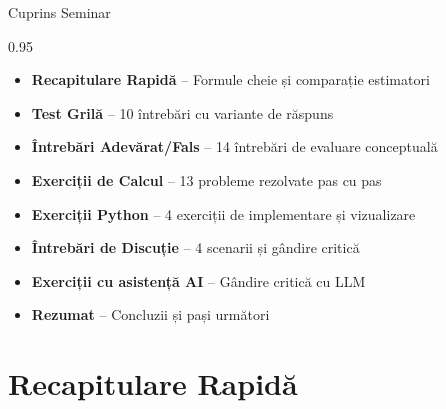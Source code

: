 \documentclass[9pt, aspectratio=169, t]{beamer}
\subtitle{Seminar 4: Estimatori de Volatilitate}
\begin{document}
{
\begin{frame}
    \titlepage
\end{frame}
}

\begin{frame}{Cuprins Seminar}
    \begin{cminipage}{0.95\textwidth}
    \begin{itemize}\setlength{\itemsep}{0pt}
        \item \textbf{Recapitulare Rapidă} -- Formule cheie și comparație estimatori
        \vspace{0.15cm}
        \item \textbf{Test Grilă} -- 10 întrebări cu variante de răspuns
        \vspace{0.15cm}
        \item \textbf{Întrebări Adevărat/Fals} -- 14 întrebări de evaluare conceptuală
        \vspace{0.15cm}
        \item \textbf{Exerciții de Calcul} -- 13 probleme rezolvate pas cu pas
        \vspace{0.15cm}
        \item \textbf{Exerciții Python} -- 4 exerciții de implementare și vizualizare
        \vspace{0.15cm}
        \item \textbf{Întrebări de Discuție} -- 4 scenarii și gândire critică
        \vspace{0.15cm}
        \item \textbf{Exerciții cu asistență AI} -- Gândire critică cu LLM
        \vspace{0.15cm}
        \item \textbf{Rezumat} -- Concluzii și pași următori
    \end{itemize}
    \end{cminipage}
\end{frame}

\section{Recapitulare Rapidă}
\end{document}
